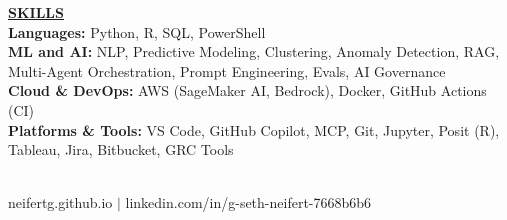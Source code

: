 \documentclass{article}
\begin{document}
\noindent \textbf{\underline{SKILLS}} \\
\noindent \textbf{Languages:} Python, R, SQL, PowerShell \\
\noindent \textbf{ML and AI:} NLP, Predictive Modeling, Clustering, Anomaly Detection, RAG, Multi-Agent Orchestration, Prompt Engineering, Evals, AI Governance \\
\noindent \textbf{Cloud \& DevOps:} AWS (SageMaker AI, Bedrock), Docker, GitHub Actions (CI) \\
\noindent \textbf{Platforms \& Tools:} VS Code, GitHub Copilot, MCP, Git, Jupyter, Posit (R), Tableau, Jira, Bitbucket, GRC Tools
\\

\begin{center}
\hrulefill \\
neifertg.github.io $\mid$ linkedin.com/in/g-seth-neifert-7668b6b6
\end{center}
\end{document}
